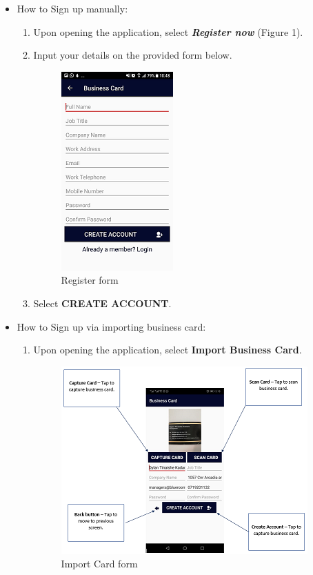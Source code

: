 \documentclass[english]{article}
\begin{document}
	\begin{itemize}	
		\item How to Sign up manually:
		\begin{enumerate}
			\item Upon opening the application, select \textbf{\textit{Register now}} (Figure 1).
			\item Input your details on the provided form below.
			
			
			\begin{figure}[h!]
				\centering
				\includegraphics[scale=0.7]{Sign_up.png}
				\caption{Register form}
				\label{figure: 2}
			\end{figure}
		
			\item Select \textbf{CREATE ACCOUNT}.
				
			 
		\end{enumerate}
		\item How to Sign up via importing business card:
		\begin{enumerate}
			\item Upon opening the application, select \textbf{Import Business Card}.
			
			\begin{figure}[h!]
				\centering
				\includegraphics[scale=0.7]{scan_def.png}
				\caption{Import Card form}
				\label{figure: 3}
			\end{figure}
			

\end{enumerate}
\end{itemize}
\end{document}
